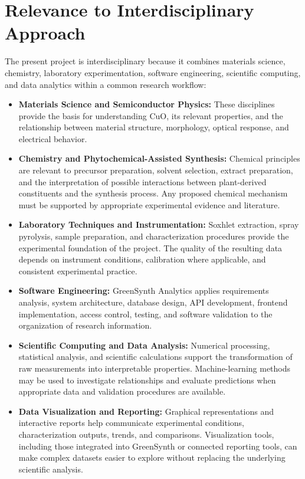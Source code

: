 \documentclass[12pt,a4paper,oneside]{report}
\begin{document}
{{{\section{Relevance to Interdisciplinary Approach}

The present project is interdisciplinary because it combines materials science, chemistry, laboratory experimentation, software engineering, scientific computing, and data analytics within a common research workflow:

\begin{itemize}
    \item \textbf{Materials Science and Semiconductor Physics:} These disciplines provide the basis for understanding $\text{CuO}$, its relevant properties, and the relationship between material structure, morphology, optical response, and electrical behavior.
    \item \textbf{Chemistry and Phytochemical-Assisted Synthesis:} Chemical principles are relevant to precursor preparation, solvent selection, extract preparation, and the interpretation of possible interactions between plant-derived constituents and the synthesis process. Any proposed chemical mechanism must be supported by appropriate experimental evidence and literature.
    \item \textbf{Laboratory Techniques and Instrumentation:} Soxhlet extraction, spray pyrolysis, sample preparation, and characterization procedures provide the experimental foundation of the project. The quality of the resulting data depends on instrument conditions, calibration where applicable, and consistent experimental practice.
    \item \textbf{Software Engineering:} GreenSynth Analytics applies requirements analysis, system architecture, database design, API development, frontend implementation, access control, testing, and software validation to the organization of research information.
    \item \textbf{Scientific Computing and Data Analysis:} Numerical processing, statistical analysis, and scientific calculations support the transformation of raw measurements into interpretable properties. Machine-learning methods may be used to investigate relationships and evaluate predictions when appropriate data and validation procedures are available.
    \item \textbf{Data Visualization and Reporting:} Graphical representations and interactive reports help communicate experimental conditions, characterization outputs, trends, and comparisons. Visualization tools, including those integrated into GreenSynth or connected reporting tools, can make complex datasets easier to explore without replacing the underlying scientific analysis.
\end{itemize}

}}}
\end{document}
